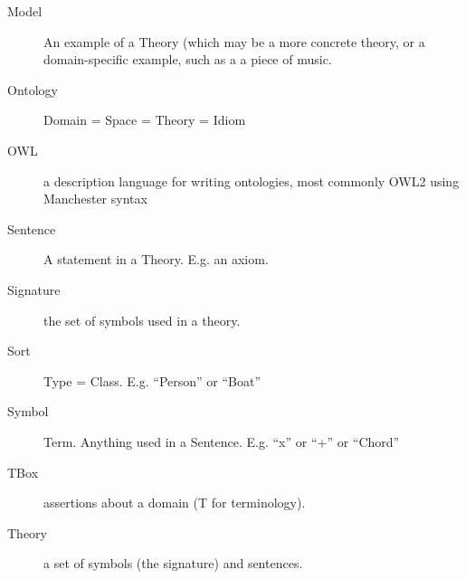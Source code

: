 \documentclass[10pt]{article}
\begin{document}
\begin{appendices}
\begin{description}
 \item[Model]{An example of a Theory (which may be a more concrete theory, or a domain-specific example, such as a a piece of music.}
 \item[Ontology]{Domain = Space = Theory = Idiom}
 \item[OWL]{a description language for writing ontologies, most commonly OWL2 using Manchester syntax}
 \item[Sentence]{A statement in a Theory. E.g. an axiom.}
 \item[Signature]{the set of symbols used in a theory.}
 \item[Sort]{Type = Class. E.g. “Person” or “Boat”}
 \item[Symbol]{Term. Anything used in a Sentence. E.g. “x” or “+” or “Chord”}
 \item[TBox]{assertions about a domain (T for terminology).}
 \item[Theory]{a set of symbols (the signature) and sentences.}
 \end{description}
\end{appendices}
\end{document}
